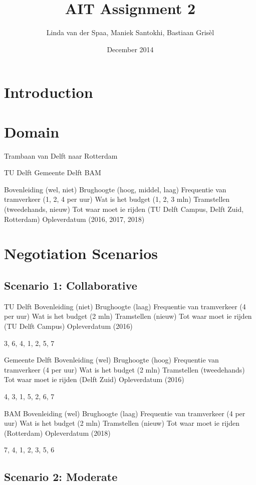 \documentclass{article}
\title{AIT Assignment 2}
\author{Linda van der Spaa, Maniek Santokhi, Bastiaan Gris\`el}
\date{December 2014}
\begin{document}
\maketitle

\section{Introduction}

\section{Domain}
Trambaan van Delft naar Rotterdam

TU Delft
Gemeente Delft
BAM

Bovenleiding (wel, niet)
Brughoogte (hoog, middel, laag)
Frequentie van tramverkeer (1, 2, 4 per uur)
Wat is het budget (1, 2, 3 mln)
Tramstellen (tweedehands, nieuw)
Tot waar moet ie rijden (TU Delft Campus, Delft Zuid, Rotterdam)
Opleverdatum (2016, 2017, 2018)


\section{Negotiation Scenarios}

\subsection{Scenario 1: Collaborative}
TU Delft
Bovenleiding (niet)
Brughoogte (laag)
Frequentie van tramverkeer (4 per uur)
Wat is het budget (2 mln)
Tramstellen (nieuw)
Tot waar moet ie rijden (TU Delft Campus)
Opleverdatum (2016)

3, 6, 4, 1, 2, 5, 7

Gemeente Delft
Bovenleiding (wel)
Brughoogte (hoog)
Frequentie van tramverkeer (4 per uur)
Wat is het budget (2 mln)
Tramstellen (tweedehands)
Tot waar moet ie rijden (Delft Zuid)
Opleverdatum (2016)

4, 3, 1, 5, 2, 6, 7

BAM
Bovenleiding (wel)
Brughoogte (laag)
Frequentie van tramverkeer (4 per uur)
Wat is het budget (2 mln)
Tramstellen (nieuw)
Tot waar moet ie rijden (Rotterdam)
Opleverdatum (2018)

7, 4, 1, 2, 3, 5, 6

\subsection{Scenario 2: Moderate}
\end{document}
